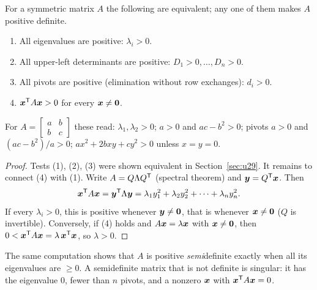 \begin{theorem}\label{thm:u31-tests}
For a symmetric matrix $A$ the following are equivalent; any one of them makes $A$ positive
definite.
\begin{enumerate}[(1)]
  \item All eigenvalues are positive: $\lambda_i>0$.
  \item All upper-left determinants are positive: $D_1>0,\dots,D_n>0$.
  \item All pivots are positive (elimination without row exchanges): $d_i>0$.
  \item $\boldsymbol{x}^{\mathsf{T}} A\boldsymbol{x}>0$ for every $\boldsymbol{x}\ne\boldsymbol{0}$.
\end{enumerate}
For $A=\left[\begin{smallmatrix}a&b\\b&c\end{smallmatrix}\right]$ these read: $\lambda_1,\lambda_2>0$;
$a>0$ and $ac-b^2>0$; pivots $a>0$ and $(ac-b^2)/a>0$; $ax^2+2bxy+cy^2>0$ unless $x=y=0$.
\end{theorem}
\begin{proof}
Tests (1), (2), (3) were shown equivalent in Section~\ref{sec:u29}. It remains to connect (4)
with (1). Write $A=Q\Lambda Q^{\mathsf{T}}$ (spectral theorem) and $\boldsymbol{y}=Q^{\mathsf{T}}\boldsymbol{x}$. Then
\[
  \boldsymbol{x}^{\mathsf{T}} A\boldsymbol{x}=\boldsymbol{y}^{\mathsf{T}}\Lambda\boldsymbol{y}=\lambda_1y_1^2+\lambda_2y_2^2+\cdots+\lambda_ny_n^2 .
\]
If every $\lambda_i>0$, this is positive whenever $\boldsymbol{y}\ne\boldsymbol{0}$, that is whenever $\boldsymbol{x}\ne\boldsymbol{0}$
($Q$ is invertible). Conversely, if (4) holds and $A\boldsymbol{x}=\lambda\boldsymbol{x}$ with $\boldsymbol{x}\ne\boldsymbol{0}$, then
$0<\boldsymbol{x}^{\mathsf{T}} A\boldsymbol{x}=\lambda\,\boldsymbol{x}^{\mathsf{T}}\boldsymbol{x}$, so $\lambda>0$.
\end{proof}

The same computation shows that $A$ is positive \emph{semi}definite exactly when all its
eigenvalues are $\ge0$. A semidefinite matrix that is not definite is singular: it has the
eigenvalue $0$, fewer than $n$ pivots, and a nonzero $\boldsymbol{x}$ with $\boldsymbol{x}^{\mathsf{T}} A\boldsymbol{x}=0$.

